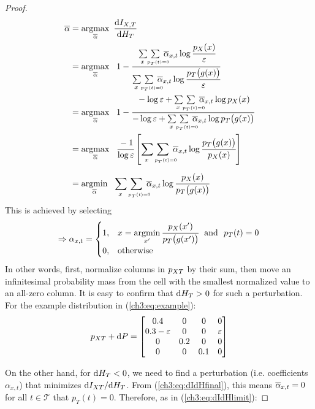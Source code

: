 \begin{proof}
\allowdisplaybreaks
\begin{align*}
    \abar 
    &= \argmax_{\abar} \ \frac{\dif{I_{X,T}}}{\dif{H_T}} \\
    &= \argmax_{\abar} \ \ 1 - \cfrac{\doublesum{x}{\ \ p_T(t)=0}  \abar_{x,t} \log \cfrac{p_X(x)}{\dpp} }{ \doublesum{x}{\ \ p_T(t)=0}  \abar_{x,t} \log \cfrac{p_T\big( g(x)\big)}{\dpp}} \\
    &= \argmax_{\abar} \ \ 1 - \cfrac{ - \log\dpp + \doublesum{x}{\ \ p_T(t)=0} \abar_{x,t} \log p_X(x) }{ - \log\dpp + \doublesum{x}{\ \ p_T(t)=0} \abar_{x,t} \log {p_T\big( g(x)\big)}} \\
    &= \argmax_{\abar} \ \ \cfrac{-1}{\log\dpp} 
    \left[ \doublesum{x}{\ \ p_T(t)=0} \abar_{x,t} \log\cfrac{p_T\big( g(x)\big)}{p_X(x)} \right] \\[5pt]
    &= \argmin_{\abar} \ \ \doublesum{x}{\ \ p_T(t)=0} \abar_{x,t} \log\cfrac{p_X(x)}{p_T\big( g(x)\big)}
\end{align*}
This is achieved by selecting
\begin{align}
    \Rightarrow \alpha_{x,t} = 
    \begin{cases}
        1, & x=\operatorname*{argmin}\limits_{x'} \cfrac{p_X(x')}{p_T\big(g(x')\big)} \ \text{ and } \ p_T(t)=0  \\
        0, & \text{otherwise}
    \end{cases}
\end{align}
In other words, first, normalize columns in $ p_{XT} $ by their sum, then move an infinitesimal probability mass from the cell with the smallest normalized value to an all-zero column. It is easy to confirm that $\text{d}{H}_T > 0$ for such a perturbation. For the example distribution in (\ref{ch3:eq:example}):
\begin{align}
    p_{XT} + \text{d}{P} = 
    \begin{bmatrix}
        0.4 & 0 & 0 & 0 \\
        0.3-\varepsilon & 0 & 0 & \varepsilon \\
        0 & 0.2 & 0 & 0 \\
        0 & 0 & 0.1 & 0 \\
    \end{bmatrix}
\end{align}

On the other hand, for $ \text{d}{H_T}<0 $, we need to find a perturbation (i.e. coefficients $ \alpha_{x,t} $) that minimizes $ \text{d}{I_{XT}} / \text{d}{H_T} $. From (\ref{ch3:eq:dIdHfinal}), this means $\overline{\alpha}_{x,t} = 0$ for all $t\in\mathcal{T}$ that $p_T(t)=0$. Therefore, as in (\ref{ch3:eq:dIdHlimit}):


\end{proof}
